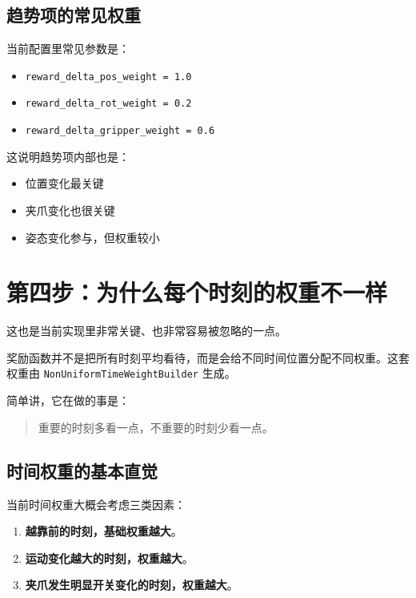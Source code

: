\documentclass[12pt]{ctexart}
\begin{document}
\subsection{趋势项的常见权重}

当前配置里常见参数是：

\begin{itemize}
    \item \texttt{reward\_delta\_pos\_weight = 1.0}
    \item \texttt{reward\_delta\_rot\_weight = 0.2}
    \item \texttt{reward\_delta\_gripper\_weight = 0.6}
\end{itemize}

这说明趋势项内部也是：

\begin{itemize}
    \item 位置变化最关键
    \item 夹爪变化也很关键
    \item 姿态变化参与，但权重较小
\end{itemize}

\section{第四步：为什么每个时刻的权重不一样}

这也是当前实现里非常关键、也非常容易被忽略的一点。

奖励函数并不是把所有时刻平均看待，而是会给不同时间位置分配不同权重。这套权重由 \texttt{NonUniformTimeWeightBuilder} 生成。

简单讲，它在做的事是：

\begin{quote}
    重要的时刻多看一点，不重要的时刻少看一点。
\end{quote}

\subsection{时间权重的基本直觉}

当前时间权重大概会考虑三类因素：

\begin{enumerate}
    \item \textbf{越靠前的时刻，基础权重越大}。
    \item \textbf{运动变化越大的时刻，权重越大}。
    \item \textbf{夹爪发生明显开关变化的时刻，权重越大}。
\end{enumerate}
\end{document}
